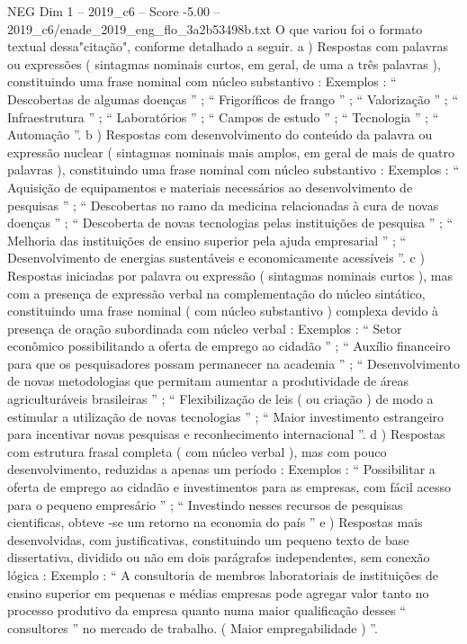 \begin{textsample}{NEG Dim 1 – 2019\_c6 – Score -5.00 – 2019\_c6/enade\_2019\_eng\_flo\_3a2b53498b.txt}
O que variou foi o formato textual dessa"citação", conforme detalhado a seguir. a ) Respostas com palavras ou expressões ( sintagmas nominais curtos, em geral, de uma a três palavras ), constituindo uma frase nominal com núcleo substantivo : Exemplos : “ Descobertas de algumas doenças ” ; “ Frigoríficos de frango ” ; “ Valorização ” ; “ Infraestrutura ” ; “ Laboratórios ” ; “ Campos de estudo ” ; “ Tecnologia ” ; “ Automação ”. b ) Respostas com desenvolvimento do conteúdo da palavra ou expressão nuclear ( sintagmas nominais mais amplos, em geral de mais de quatro palavras ), constituindo uma frase nominal com núcleo substantivo : Exemplos : “ Aquisição de equipamentos e materiais necessários ao desenvolvimento de pesquisas ” ; “ Descobertas no ramo da medicina relacionadas à cura de novas doenças ” ; “ Descoberta de novas tecnologias pelas instituições de pesquisa ” ; “ Melhoria das instituições de ensino superior pela ajuda empresarial ” ; “ Desenvolvimento de energias sustentáveis e economicamente acessíveis ”. c ) Respostas iniciadas por palavra ou expressão ( sintagmas nominais curtos ), mas com a presença de expressão verbal na complementação do núcleo sintático, constituindo uma frase nominal ( com núcleo substantivo ) complexa devido à presença de oração subordinada com núcleo verbal : Exemplos : “ Setor econômico possibilitando a oferta de emprego ao cidadão ” ; “ Auxílio financeiro para que os pesquisadores possam permanecer na academia ” ; “ Desenvolvimento de novas metodologias que permitam aumentar a produtividade de áreas agriculturáveis brasileiras ” ; “ Flexibilização de leis ( ou criação ) de modo a estimular a utilização de novas tecnologias ” ; “ Maior investimento estrangeiro para incentivar novas pesquisas e reconhecimento internacional ”. d ) Respostas com estrutura frasal completa ( com núcleo verbal ), mas com pouco desenvolvimento, reduzidas a apenas um período : Exemplos : “ Possibilitar a oferta de emprego ao cidadão e investimentos para as empresas, com fácil acesso para o pequeno empresário ” ; “ Investindo nesses recursos de pesquisas cientificas, obteve -se um retorno na economia do país ” e ) Respostas mais desenvolvidas, com justificativas, constituindo um pequeno texto de base dissertativa, dividido ou não em dois parágrafos independentes, sem conexão lógica : Exemplo : “ A consultoria de membros laboratoriais de instituições de ensino superior em pequenas e médias empresas pode agregar valor tanto no processo produtivo da empresa quanto numa maior qualificação desses “ consultores ” no mercado de trabalho. ( Maior empregabilidade ) ”.

\end{textsample}
